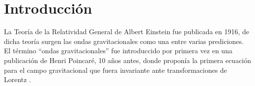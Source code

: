
%


\newcommand{\keyword}[1]{\textit{#1}}


\section{Introducción}
	La Teor\'ia de la Relatividad General de Albert Einstein fue publicada en 1916, de dicha teor\'ia surgen las ondas gravitacionales como una entre varias prediciones. El t\'ermino ``ondas gravitacionales'' fue introduccido por primera vez en una publicaci\'on de Henri Poincaré, 10 a\~nos antes, donde propon\'ia la primera ecuaci\'on para el campo gravitacional que fuera invariante ante transformaciones de Lorentz \cite{straumann2012general, bassan2014advanced}.
	
	
	
	
	
		
	
